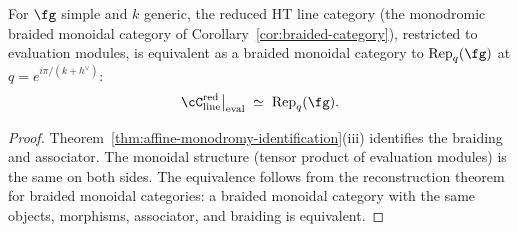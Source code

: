 \begin{corollary}
\label{cor:affine-line-category}
For $\fg$ simple and $k$ generic, the reduced HT line category (the monodromic braided monoidal category of Corollary~\textup{\ref{cor:braided-category}}), restricted to evaluation modules, is equivalent as a braided monoidal category to $\mathrm{Rep}_q(\fg)$ at $q = e^{i\pi/(k + h^\vee)}$:
\[
 \cC_{\mathrm{line}}^{\mathrm{red}}\big|_{\mathrm{eval}} \;\simeq\; \mathrm{Rep}_q(\fg).
\]
\end{corollary}

\begin{proof}
Theorem~\ref{thm:affine-monodromy-identification}(iii) identifies the braiding and associator. The monoidal structure (tensor product of evaluation modules) is the same on both sides. The equivalence follows from the reconstruction theorem for braided monoidal categories: a braided monoidal category with the same objects, morphisms, associator, and braiding is equivalent.
\end{proof}

